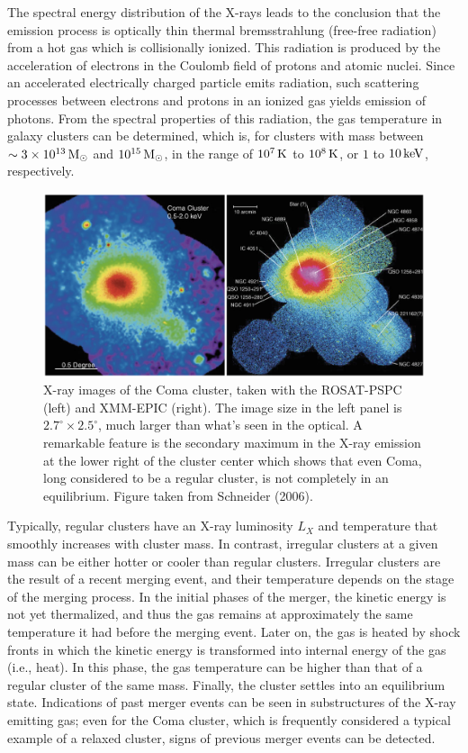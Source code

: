 \documentclass[a4paper,11pt]{article}
\begin{document}
{\noindent}The spectral energy distribution of the X-rays leads to the conclusion that the emission process is optically thin thermal bremsstrahlung (free-free radiation) from a hot gas which is collisionally ionized. This radiation is produced by the acceleration of electrons in the Coulomb field of protons and atomic nuclei. Since an accelerated electrically charged particle emits radiation, such scattering processes between electrons and protons in an ionized gas yields emission of photons. From the spectral properties of this radiation, the gas temperature in galaxy clusters can be determined, which is, for clusters with mass between $\sim3\times10^{13}\,{\rm M_\odot}$ and $10^{15}\,{\rm M_\odot}$, in the range of $10^7\,{\rm K}$ to $10^8\,{\rm K}$, or $1$ to $10\,{\rm keV}$, respectively.

\begin{figure}[t]
    \centering
    \includegraphics[width=14cm]{figures/ComaXray.png}
    \caption{\footnotesize{X-ray images of the Coma cluster, taken with the ROSAT-PSPC (left) and XMM-EPIC (right). The image size in the left panel is $2.7^\circ\times2.5^\circ$, much larger than what's seen in the optical. A remarkable feature is the secondary maximum in the X-ray emission at the lower right of the cluster center which shows that even Coma, long considered to be a regular cluster, is not completely in an equilibrium. Figure taken from Schneider (2006).}}
    \label{fig:comaxray}
\end{figure}

{\noindent}Typically, regular clusters have an X-ray luminosity $L_X$ and temperature that smoothly increases with cluster mass. In contrast, irregular clusters at a given mass can be either hotter or cooler than regular clusters. Irregular clusters are the result of a recent merging event, and their temperature depends on the stage of the merging process. In the initial phases of the merger, the kinetic energy is not yet thermalized, and thus the gas remains at approximately the same temperature it had before the merging event. Later on, the gas is heated by shock fronts in which the kinetic energy is transformed into internal energy of the gas (i.e., heat). In this phase, the gas temperature can be higher than that of a regular cluster of the same mass. Finally, the cluster settles into an equilibrium state. Indications of past merger events can be seen in substructures of the X-ray emitting gas; even for the Coma cluster, which is frequently considered a typical example of a relaxed cluster, signs of previous merger events can be detected.
\end{document}
